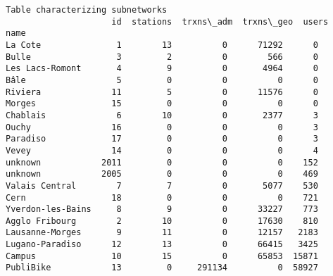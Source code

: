 \documentclass{report}
\begin{document}
    \begin{Verbatim}[commandchars=\\\{\}]
Table characterizing subnetworks
                     id  stations  trxns\_adm  trxns\_geo  users
name                                                          
La Cote               1        13          0      71292      0
Bulle                 3         2          0        566      0
Les Lacs-Romont       4         9          0       4964      0
Bâle                  5         0          0          0      0
Riviera              11         5          0      11576      0
Morges               15         0          0          0      0
Chablais              6        10          0       2377      3
Ouchy                16         0          0          0      3
Paradiso             17         0          0          0      3
Vevey                14         0          0          0      4
unknown            2011         0          0          0    152
unknown            2005         0          0          0    469
Valais Central        7         7          0       5077    530
Cern                 18         0          0          0    721
Yverdon-les-Bains     8         9          0      33227    773
Agglo Fribourg        2        10          0      17630    810
Lausanne-Morges       9        11          0      12157   2183
Lugano-Paradiso      12        13          0      66415   3425
Campus               10        15          0      65853  15871
PubliBike            13         0     291134          0  58927
    \end{Verbatim}
\end{document}
